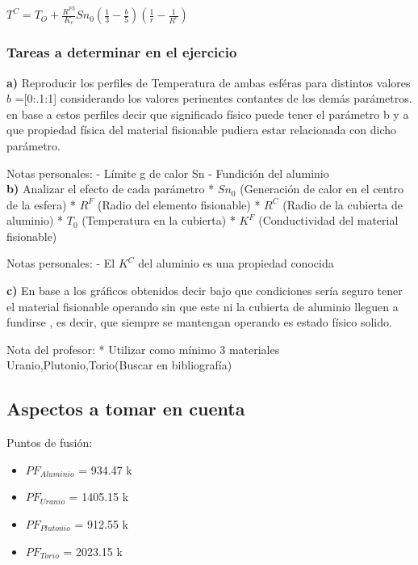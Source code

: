 \documentclass[11pt]{article}
\providecommand{\tightlist}{%
      \setlength{\itemsep}{0pt}\setlength{\parskip}{0pt}}
\begin{document}
\(T^C=T_O+\frac{R^{F3}}{K_c}Sn_0(\frac{1}{3}-\frac{b}{5})(\frac{1}{r}-\frac{1}{R^c})\)

    \hypertarget{tareas-a-determinar-en-el-ejercicio}{%
\subsubsection{Tareas a determinar en el
ejercicio}\label{tareas-a-determinar-en-el-ejercicio}}

\textbf{a)} Reproducir los perfiles de Temperatura de ambas esféras para
distintos valores \(b\) ={[}0:.1:1{]} considerando los valores
perinentes contantes de los demás parámetros. en base a estos perfiles
decir que significado físico puede tener el parámetro b y a que
propiedad física del material fisionable pudiera estar relacionada con
dicho parámetro.

Notas personales: - Límite g de calor Sn - Fundición del aluminio\\

\textbf{b)} Analizar el efecto de cada parámetro * \(Sn_0\) (Generación
de calor en el centro de la esfera) * \(R^F\) (Radio del elemento
fisionable) * \(R^C\) (Radio de la cubierta de aluminio) * \(T_0\)
(Temperatura en la cubierta) * \(K^F\) (Conductividad del material
fisionable)

Notas personales: - El \(K^C\) del aluminio es una propiedad conocida

\textbf{c)} En base a los gráficos obtenidos decir bajo que condiciones
sería seguro tener el material fisionable operando sin que este ni la
cubierta de aluminio lleguen a fundirse , es decir, que siempre se
mantengan operando es estado físico solido.

Nota del profesor: * Utilizar como mínimo 3 materiales
Uranio,Plutonio,Torio(Buscar en bibliografía)

    \hypertarget{aspectos-a-tomar-en-cuenta}{%
\subsection{Aspectos a tomar en
cuenta}\label{aspectos-a-tomar-en-cuenta}}

Puntos de fusión:

\begin{itemize}
\tightlist
\item
  \(PF_{Aluminio}\) = 934.47 k
\item
  \(PF_{Uranio}\) = 1405.15 k
\item
  \(PF_{Plutonio}\) = 912.55 k
\item
  \(PF_{Torio}\) = 2023.15 k
\end{itemize}
\end{document}
